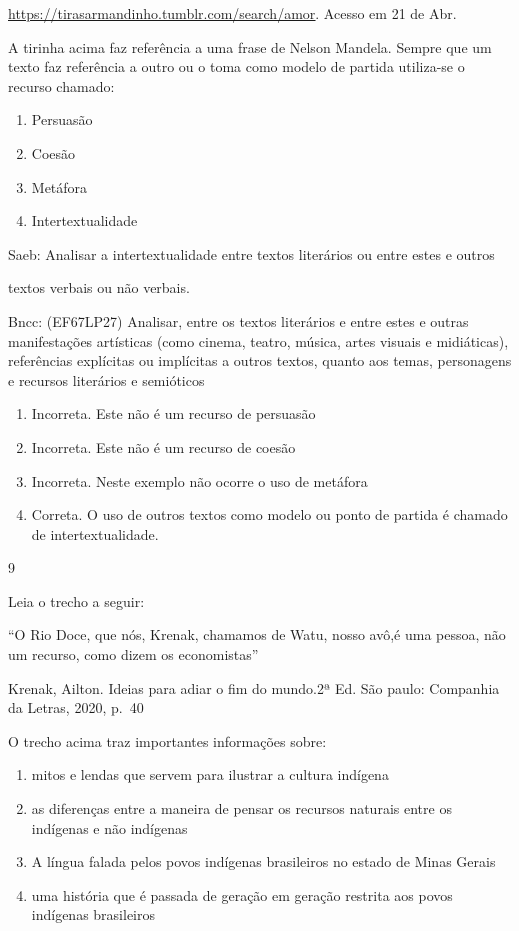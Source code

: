 {{\begin{escolha}
{\begin{itemize}
\begin{itemize}
\href{https://tirasarmandinho.tumblr.com/search/amor}{\uline{https://tirasarmandinho.tumblr.com/search/amor}}.
Acesso em 21 de Abr.

A tirinha acima faz referência a uma frase de Nelson Mandela. Sempre que
um texto faz referência a outro ou o toma como modelo de partida
utiliza-se o recurso chamado:

\begin{enumerate}
\def\labelenumi{\alph{enumi})}
\item
  Persuasão
\item
  Coesão
\item
  Metáfora
\item
  Intertextualidade
\end{enumerate}

Saeb: Analisar a intertextualidade entre textos literários ou entre
estes e outros

textos verbais ou não verbais.

Bncc: (EF67LP27) Analisar, entre os textos literários e entre estes e
outras manifestações artísticas (como cinema, teatro, música, artes
visuais e midiáticas), referências explícitas ou implícitas a outros
textos, quanto aos temas, personagens e recursos literários e semióticos

\begin{enumerate}
\def\labelenumi{\arabic{enumi}.}
\item
  Incorreta. Este não é um recurso de persuasão
\item
  Incorreta. Este não é um recurso de coesão
\item
  Incorreta. Neste exemplo não ocorre o uso de metáfora
\item
  Correta. O uso de outros textos como modelo ou ponto de partida é
  chamado de intertextualidade.
\end{enumerate}

\num{9}

Leia o trecho a seguir:

``O Rio Doce, que nós, Krenak, chamamos de Watu, nosso avô,é uma pessoa,
não um recurso, como dizem os economistas''

Krenak, Ailton. Ideias para adiar o fim do mundo.2ª Ed. São paulo:
Companhia da Letras, 2020, p.~40

O trecho acima traz importantes informações sobre:

\begin{enumerate}
\def\labelenumi{\alph{enumi})}
\item
  mitos e lendas que servem para ilustrar a cultura indígena
\item
  as diferenças entre a maneira de pensar os recursos naturais entre os
  indígenas e não indígenas
\item
  A língua falada pelos povos indígenas brasileiros no estado de Minas
  Gerais
\item
  uma história que é passada de geração em geração restrita aos povos
  indígenas brasileiros
\end{enumerate}


\end{itemize}
\end{itemize}}
\end{escolha}}}
